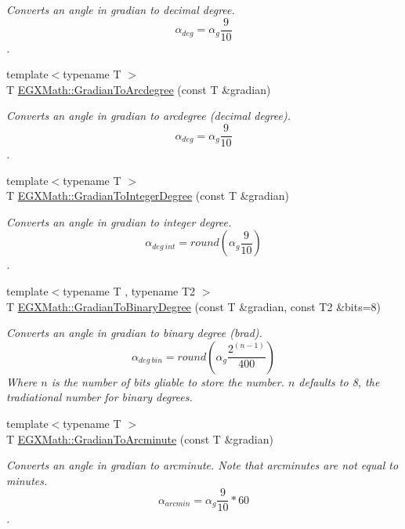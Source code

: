 \begin{DoxyCompactItemize}
\begin{DoxyCompactList}\small\item\em Converts an angle in gradian to decimal degree. \[\alpha_{deg}=\alpha_{g}\frac{9}{10}\]. \end{DoxyCompactList}\item 
{\footnotesize template$<$typename T $>$ }\\T \mbox{\hyperlink{group___e_g_x_math-_angle_conversions-_gradian_gacd0b1797f2460944dcbc541a855ec21c}{E\+G\+X\+Math\+::\+Gradian\+To\+Arcdegree}} (const T \&gradian)
\begin{DoxyCompactList}\small\item\em Converts an angle in gradian to arcdegree (decimal degree). \[\alpha_{deg}=\alpha_{g}\frac{9}{10}\]. \end{DoxyCompactList}\item 
{\footnotesize template$<$typename T $>$ }\\T \mbox{\hyperlink{group___e_g_x_math-_angle_conversions-_gradian_ga555aae885f8a7d0876a36aa07cbbd816}{E\+G\+X\+Math\+::\+Gradian\+To\+Integer\+Degree}} (const T \&gradian)
\begin{DoxyCompactList}\small\item\em Converts an angle in gradian to integer degree. \[\alpha_{deg\ int}=round(\alpha_{g}\frac{9}{10})\]. \end{DoxyCompactList}\item 
{\footnotesize template$<$typename T , typename T2 $>$ }\\T \mbox{\hyperlink{group___e_g_x_math-_angle_conversions-_gradian_ga6bf31920148bfd61f1f06eb961c3f62b}{E\+G\+X\+Math\+::\+Gradian\+To\+Binary\+Degree}} (const T \&gradian, const T2 \&bits=8)
\begin{DoxyCompactList}\small\item\em Converts an angle in gradian to binary degree (brad). \[\alpha_{deg\ bin}=round(\alpha_{g}\frac{2^{(n-1)}}{400})\] Where $n$ is the number of bits gliable to store the number. $n$ defaults to 8, the tradiational number for binary degrees. \end{DoxyCompactList}\item 
{\footnotesize template$<$typename T $>$ }\\T \mbox{\hyperlink{group___e_g_x_math-_angle_conversions-_gradian_ga67ef7daad49b0d73c39c52d426ab46a5}{E\+G\+X\+Math\+::\+Gradian\+To\+Arcminute}} (const T \&gradian)
\begin{DoxyCompactList}\small\item\em Converts an angle in gradian to arcminute. Note that arcminutes are not equal to minutes. \[\alpha_{arcmin}=\alpha_{g}\frac{9}{10} * 60\]. \end{DoxyCompactList}\item 

\end{DoxyCompactItemize}
